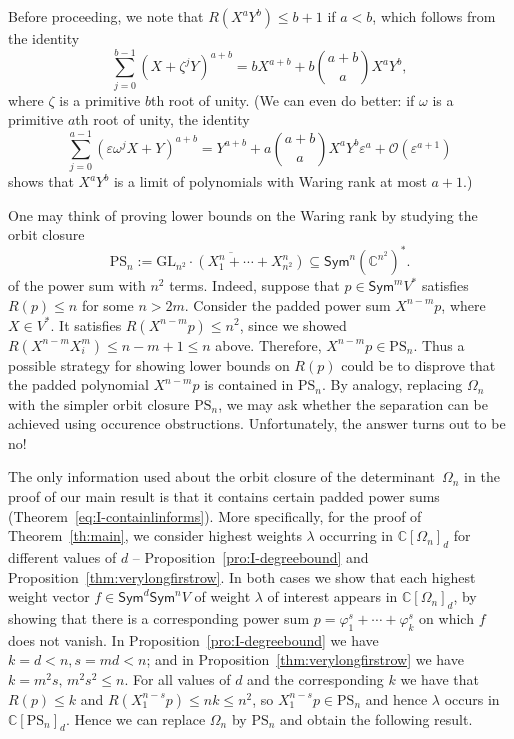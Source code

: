 \documentclass[11pt]{amsart}
\def\C{\mathbb{C}}
\def\GL{\mathrm{GL}}
\def\Sym{\mathsf{Sym}}
\newcommand{\Det}{\Omega}
\newcommand{\ol}[1]{\overline{#1}}
\newcommand{\PS}{\mathrm{PS}}
\numberwithin{equation}{section}
\begin{document}
Before proceeding, we note that $R(X^aY^b) \le b+1$ if $a<b$, which follows from the identity 
\begin{equation*}
 \sum_{j=0}^{b-1} (X+\zeta^j Y)^{a+b} = b X^{a+b} + b {a+b \choose a} X^a Y^b ,
\end{equation*}
where $\zeta$ is a primitive $b$th root of unity. 
(We can even do better: 
if $\omega$ is a primitive $a$th root of unity, the identity 
$$
 \sum_{j=0}^{a-1} (\varepsilon \omega^j X + Y) ^{a+b} = 
  Y^{a+b} + a {a+b \choose a}  X^a Y^b \varepsilon^a + \mathcal{O}(\varepsilon^{a+1}) 
$$
shows that $X^aY^b$ is a limit of polynomials with Waring rank at most $a+1$.) 

One may think of proving lower bounds on the Waring rank by studying the 
orbit closure 
$$
 \PS_n := \ol{\GL_{n^2}\cdot (X^n_1 + \cdots + X^n_{n^2})} \subseteq \Sym^n (\C^{n^2})^* .
$$
of the power sum with $n^2$ terms. Indeed, 
suppose that $p\in\Sym^m V^*$ satisfies $R(p) \le n$ for some $n > 2m$. 
Consider the padded power sum $X^{n-m}p$, where $X\in V^*$. 
It satisfies $R(X^{n-m}p) \le n^2$, since 
we showed $R(X^{n-m} X_i^m) \le n-m+1 \le n$ above. 
Therefore, $X^{n-m}p \in \PS_n$. 
Thus a possible strategy for showing lower bounds on $R(p)$ could be 
to disprove that the padded polynomial $X^{n-m}p$ is contained in $\PS_n$. 
By analogy,  replacing $\Det_n$ with the simpler orbit closure $\PS_n$, 
we may ask whether the separation can be achieved using occurence obstructions.
Unfortunately, the answer turns out to be no!
 

The only information used about the orbit closure of the determinant~$\Det_n$ in the proof of our main result 
is that it contains certain padded power sums (Theorem~\ref{eq:I-containlinforms}). 
More specifically, for the proof of Theorem~\ref{th:main}, we consider highest weights $\lambda$ occurring in $\C[\Det_n]_d$ 
for different values of $d$ -- Proposition~\ref{pro:I-degreebound} and Proposition~\ref{thm:verylongfirstrow}. 
In both cases we show that each highest weight vector $f \in \Sym^d \Sym^n V$ of weight $\lambda$ of interest appears in $\C[\Det_n]_d$, 
by showing that there is a corresponding power sum $p=\varphi_1^s+\cdots+\varphi^s_k$ on which $f$ does not vanish. 
In Proposition~\ref{pro:I-degreebound} we have $k=d<n, s=md<n$; and in Proposition~\ref{thm:verylongfirstrow} 
we have $k=m^2s, \,  m^2s^2 \leq n$. For all values of $d$ and the corresponding $k$ 
we have that $R(p) \leq k$ and $R(X_1^{n-s}p) \leq n k\leq n^2$, so $X_1^{n-s}p \in \PS_n$ 
and hence $\lambda$ occurs in $\C[\PS_n]_d$.  
Hence we can replace $\Det_n$ by $\PS_n$ and obtain the following result.
\end{document}
